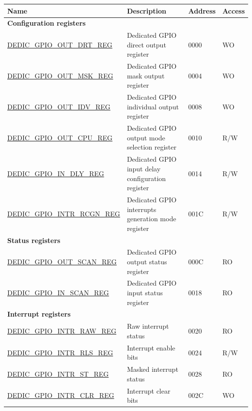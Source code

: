 \begin{longtable}{ | p{5cm} | p{8.2cm} | p{1.3cm} | p{1cm} | }
\hline\rowcolor{lightgray}
Name & Description &  Address & Access \\ \hline
\endhead
\multicolumn{4}{|l|}{\textbf{Configuration registers}} \\ \hline
\hyperref[regdesc:DEDICGPIOOUTDRTREG]{DEDIC\_GPIO\_OUT\_DRT\_REG} & Dedicated GPIO direct output register & \hexprefix{}0000 & WO \\ \hline
\hyperref[regdesc:DEDICGPIOOUTMSKREG]{DEDIC\_GPIO\_OUT\_MSK\_REG} & Dedicated GPIO mask output register & \hexprefix{}0004 & WO \\ \hline
\hyperref[regdesc:DEDICGPIOOUTIDVREG]{DEDIC\_GPIO\_OUT\_IDV\_REG} & Dedicated GPIO individual output register & \hexprefix{}0008 & WO \\ \hline
\hyperref[regdesc:DEDICGPIOOUTCPUREG]{DEDIC\_GPIO\_OUT\_CPU\_REG} & Dedicated GPIO output mode selection register & \hexprefix{}0010 & R/W \\ \hline
\hyperref[regdesc:DEDICGPIOINDLYREG]{DEDIC\_GPIO\_IN\_DLY\_REG} & Dedicated GPIO input delay configuration register & \hexprefix{}0014 & R/W \\ \hline
\hyperref[regdesc:DEDICGPIOINTRRCGNREG]{DEDIC\_GPIO\_INTR\_RCGN\_REG} & Dedicated GPIO interrupts generation mode register & \hexprefix{}001C & R/W \\ \hline
\multicolumn{4}{|l|}{\textbf{Status registers}} \\ \hline
\hyperref[regdesc:DEDICGPIOOUTSCANREG]{DEDIC\_GPIO\_OUT\_SCAN\_REG} & Dedicated GPIO output status register & \hexprefix{}000C & RO \\ \hline
\hyperref[regdesc:DEDICGPIOINSCANREG]{DEDIC\_GPIO\_IN\_SCAN\_REG} & Dedicated GPIO input status register & \hexprefix{}0018 & RO \\ \hline
\multicolumn{4}{|l|}{\textbf{Interrupt registers}} \\ \hline
\hyperref[regdesc:DEDICGPIOINTRRAWREG]{DEDIC\_GPIO\_INTR\_RAW\_REG} & Raw interrupt status & \hexprefix{}0020 & RO \\ \hline
\hyperref[regdesc:DEDICGPIOINTRRLSREG]{DEDIC\_GPIO\_INTR\_RLS\_REG} & Interrupt enable bits & \hexprefix{}0024 & R/W \\ \hline
\hyperref[regdesc:DEDICGPIOINTRSTREG]{DEDIC\_GPIO\_INTR\_ST\_REG} & Masked interrupt status & \hexprefix{}0028 & RO \\ \hline
\hyperref[regdesc:DEDICGPIOINTRCLRREG]{DEDIC\_GPIO\_INTR\_CLR\_REG} & Interrupt clear bits & \hexprefix{}002C & WO \\ \hline
\end{longtable}
